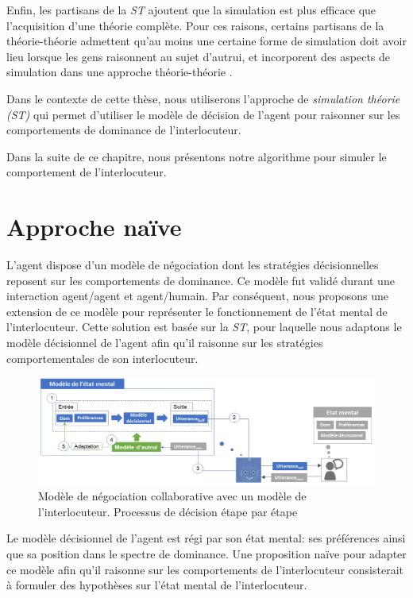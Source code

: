 Enfin, les partisans de la \emph{ST} ajoutent que la simulation est plus efficace que l'acquisition d'une théorie complète. Pour ces raisons, certains partisans de la théorie-théorie admettent qu'au moins une certaine forme de simulation doit avoir lieu lorsque les gens raisonnent au sujet d'autrui, et incorporent des aspects de simulation dans une approche théorie-théorie \cite{harbers2012modeling}.

Dans le contexte de cette thèse, nous utiliserons l'approche de \emph{simulation théorie (ST)} qui permet d'utiliser le modèle de décision de l'agent pour raisonner sur les comportements de dominance de l'interlocuteur. 

Dans la suite de ce chapitre, nous présentons notre algorithme pour simuler le comportement de l'interlocuteur.

\section{Approche naïve}
L'agent dispose d'un modèle de négociation dont les stratégies décisionnelles reposent sur les comportements de dominance. Ce modèle fut validé durant une interaction agent/agent et agent/humain. Par conséquent, nous proposons une extension de ce modèle pour représenter le fonctionnement de l'état mental de l'interlocuteur. Cette solution est basée sur la \emph{ST}, pour laquelle nous adaptons le modèle décisionnel de l'agent afin qu'il raisonne sur les stratégies comportementales de son interlocuteur.

\begin{figure}
	\centering
	\includegraphics[width=\linewidth, height=0.35\textheight]{Figures/chap5/model/general.png}
	\caption{Modèle de négociation collaborative avec un modèle de l'interlocuteur. Processus de décision étape par étape} 
	\label{fig:schema-general}
\end{figure}
	



Le modèle décisionnel de l'agent est régi par son état mental: ses préférences ainsi que sa position dans le spectre de dominance. Une proposition naïve pour adapter ce modèle afin qu'il raisonne sur les comportements de l'interlocuteur consisterait à formuler des hypothèses sur l'état mental de l'interlocuteur. 

